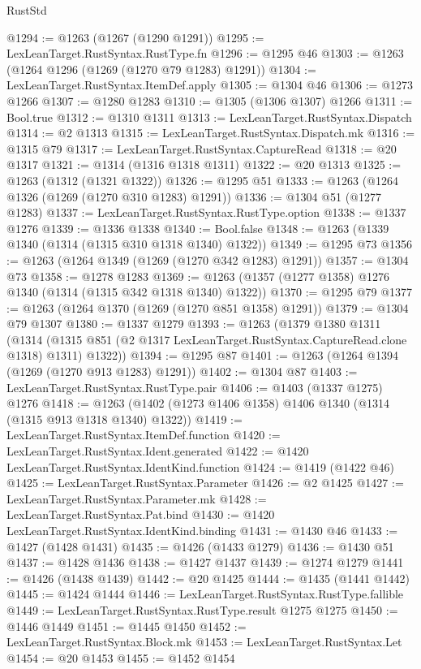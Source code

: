 \begin{lexlean}{RustStd}
\begin{coremodule}
{\begin{coremodule}
{{{{{{{{{{{{{{{{{{{{{{{{{{{{{{@1294 := @1263 (@1267 (@1290 @1291))
@1295 := LexLeanTarget.RustSyntax.RustType.fn
@1296 := @1295 @46
@1303 := @1263 (@1264 @1296 (@1269 (@1270 @79 @1283) @1291))
@1304 := LexLeanTarget.RustSyntax.ItemDef.apply
@1305 := @1304 @46
@1306 := @1273 @1266
@1307 := @1280 @1283
@1310 := @1305 (@1306 @1307) @1266
@1311 := Bool.true
@1312 := @1310 @1311
@1313 := LexLeanTarget.RustSyntax.Dispatch
@1314 := @2 @1313
@1315 := LexLeanTarget.RustSyntax.Dispatch.mk
@1316 := @1315 @79
@1317 := LexLeanTarget.RustSyntax.CaptureRead
@1318 := @20 @1317
@1321 := @1314 (@1316 @1318 @1311)
@1322 := @20 @1313
@1325 := @1263 (@1312 (@1321 @1322))
@1326 := @1295 @51
@1333 := @1263 (@1264 @1326 (@1269 (@1270 @310 @1283) @1291))
@1336 := @1304 @51 (@1277 @1283)
@1337 := LexLeanTarget.RustSyntax.RustType.option
@1338 := @1337 @1276
@1339 := @1336 @1338
@1340 := Bool.false
@1348 := @1263 (@1339 @1340 (@1314 (@1315 @310 @1318 @1340) @1322))
@1349 := @1295 @73
@1356 := @1263 (@1264 @1349 (@1269 (@1270 @342 @1283) @1291))
@1357 := @1304 @73
@1358 := @1278 @1283
@1369 := @1263 (@1357 (@1277 @1358) @1276 @1340 (@1314 (@1315 @342 @1318 @1340) @1322))
@1370 := @1295 @79
@1377 := @1263 (@1264 @1370 (@1269 (@1270 @851 @1358) @1291))
@1379 := @1304 @79 @1307
@1380 := @1337 @1279
@1393 := @1263
    (@1379
      @1380
      @1311
      (@1314 (@1315 @851 (@2 @1317 LexLeanTarget.RustSyntax.CaptureRead.clone @1318) @1311) @1322))
@1394 := @1295 @87
@1401 := @1263 (@1264 @1394 (@1269 (@1270 @913 @1283) @1291))
@1402 := @1304 @87
@1403 := LexLeanTarget.RustSyntax.RustType.pair
@1406 := @1403 (@1337 @1275) @1276
@1418 := @1263 (@1402 (@1273 @1406 @1358) @1406 @1340 (@1314 (@1315 @913 @1318 @1340) @1322))
@1419 := LexLeanTarget.RustSyntax.ItemDef.function
@1420 := LexLeanTarget.RustSyntax.Ident.generated
@1422 := @1420 LexLeanTarget.RustSyntax.IdentKind.function
@1424 := @1419 (@1422 @46)
@1425 := LexLeanTarget.RustSyntax.Parameter
@1426 := @2 @1425
@1427 := LexLeanTarget.RustSyntax.Parameter.mk
@1428 := LexLeanTarget.RustSyntax.Pat.bind
@1430 := @1420 LexLeanTarget.RustSyntax.IdentKind.binding
@1431 := @1430 @46
@1433 := @1427 (@1428 @1431)
@1435 := @1426 (@1433 @1279)
@1436 := @1430 @51
@1437 := @1428 @1436
@1438 := @1427 @1437
@1439 := @1274 @1279
@1441 := @1426 (@1438 @1439)
@1442 := @20 @1425
@1444 := @1435 (@1441 @1442)
@1445 := @1424 @1444
@1446 := LexLeanTarget.RustSyntax.RustType.fallible
@1449 := LexLeanTarget.RustSyntax.RustType.result @1275 @1275
@1450 := @1446 @1449
@1451 := @1445 @1450
@1452 := LexLeanTarget.RustSyntax.Block.mk
@1453 := LexLeanTarget.RustSyntax.Let
@1454 := @20 @1453
@1455 := @1452 @1454
}}}}}}}}}}}}}}}}}}}}}}}}}}}}}}
\end{coremodule}}
\end{coremodule}
\end{lexlean}
